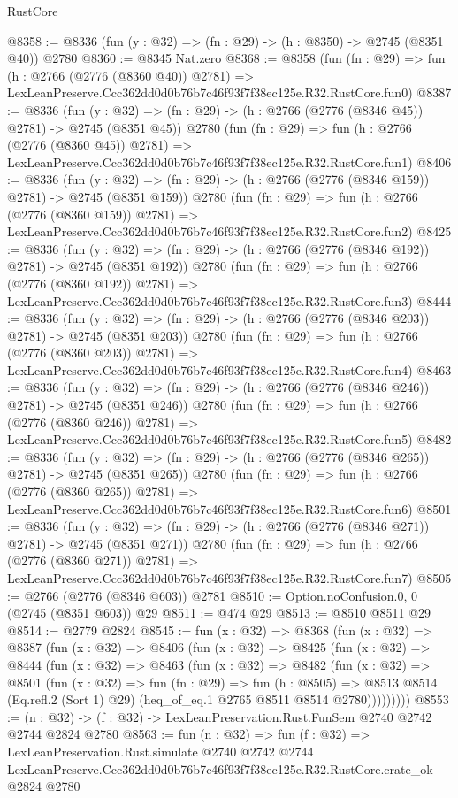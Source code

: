 \begin{lexlean}{RustCore}
\begin{coremodule}
@8358 := @8336 (fun (y : @32) => (fn : @29) -> (h : @8350) -> @2745 (@8351 @40)) @2780
@8360 := @8345 Nat.zero
@8368 := @8358
    (fun (fn : @29) =>
    fun (h : @2766 (@2776 (@8360 @40)) @2781) =>
    LexLeanPreserve.Ccc362dd0d0b76b7c46f93f7f38ec125e.R32.RustCore.fun0)
@8387 := @8336
    (fun (y : @32) => (fn : @29) -> (h : @2766 (@2776 (@8346 @45)) @2781) -> @2745 (@8351 @45))
    @2780
    (fun (fn : @29) =>
    fun (h : @2766 (@2776 (@8360 @45)) @2781) =>
    LexLeanPreserve.Ccc362dd0d0b76b7c46f93f7f38ec125e.R32.RustCore.fun1)
@8406 := @8336
    (fun (y : @32) => (fn : @29) -> (h : @2766 (@2776 (@8346 @159)) @2781) -> @2745 (@8351 @159))
    @2780
    (fun (fn : @29) =>
    fun (h : @2766 (@2776 (@8360 @159)) @2781) =>
    LexLeanPreserve.Ccc362dd0d0b76b7c46f93f7f38ec125e.R32.RustCore.fun2)
@8425 := @8336
    (fun (y : @32) => (fn : @29) -> (h : @2766 (@2776 (@8346 @192)) @2781) -> @2745 (@8351 @192))
    @2780
    (fun (fn : @29) =>
    fun (h : @2766 (@2776 (@8360 @192)) @2781) =>
    LexLeanPreserve.Ccc362dd0d0b76b7c46f93f7f38ec125e.R32.RustCore.fun3)
@8444 := @8336
    (fun (y : @32) => (fn : @29) -> (h : @2766 (@2776 (@8346 @203)) @2781) -> @2745 (@8351 @203))
    @2780
    (fun (fn : @29) =>
    fun (h : @2766 (@2776 (@8360 @203)) @2781) =>
    LexLeanPreserve.Ccc362dd0d0b76b7c46f93f7f38ec125e.R32.RustCore.fun4)
@8463 := @8336
    (fun (y : @32) => (fn : @29) -> (h : @2766 (@2776 (@8346 @246)) @2781) -> @2745 (@8351 @246))
    @2780
    (fun (fn : @29) =>
    fun (h : @2766 (@2776 (@8360 @246)) @2781) =>
    LexLeanPreserve.Ccc362dd0d0b76b7c46f93f7f38ec125e.R32.RustCore.fun5)
@8482 := @8336
    (fun (y : @32) => (fn : @29) -> (h : @2766 (@2776 (@8346 @265)) @2781) -> @2745 (@8351 @265))
    @2780
    (fun (fn : @29) =>
    fun (h : @2766 (@2776 (@8360 @265)) @2781) =>
    LexLeanPreserve.Ccc362dd0d0b76b7c46f93f7f38ec125e.R32.RustCore.fun6)
@8501 := @8336
    (fun (y : @32) => (fn : @29) -> (h : @2766 (@2776 (@8346 @271)) @2781) -> @2745 (@8351 @271))
    @2780
    (fun (fn : @29) =>
    fun (h : @2766 (@2776 (@8360 @271)) @2781) =>
    LexLeanPreserve.Ccc362dd0d0b76b7c46f93f7f38ec125e.R32.RustCore.fun7)
@8505 := @2766 (@2776 (@8346 @603)) @2781
@8510 := Option.noConfusion.{0, 0} (@2745 (@8351 @603)) @29
@8511 := @474 @29
@8513 := @8510 @8511 @29
@8514 := @2779 @2824
@8545 := fun (x : @32) =>
  @8368
    (fun (x : @32) =>
    @8387
      (fun (x : @32) =>
      @8406
        (fun (x : @32) =>
        @8425
          (fun (x : @32) =>
          @8444
            (fun (x : @32) =>
            @8463
              (fun (x : @32) =>
              @8482
                (fun (x : @32) =>
                @8501
                  (fun (x : @32) =>
                  fun (fn : @29) =>
                  fun (h : @8505) =>
                  @8513
                    @8514
                    (Eq.refl.{2} (Sort 1) @29)
                    (heq_of_eq.{1} @2765 @8511 @8514 @2780)))))))))
@8553 := (n : @32) -> (f : @32) -> LexLeanPreservation.Rust.FunSem @2740 @2742 @2744 @2824 @2780
@8563 := fun (n : @32) =>
  fun (f : @32) =>
  LexLeanPreservation.Rust.simulate
    @2740
    @2742
    @2744
    LexLeanPreserve.Ccc362dd0d0b76b7c46f93f7f38ec125e.R32.RustCore.crate_ok
    @2824
    @2780
\end{coremodule}
\end{lexlean}
